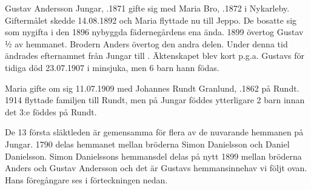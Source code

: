 %
Gustav Andersson Jungar, .1871 gifte sig med Maria Bro, .1872 i Nykarleby. Giftermålet skedde 14.08.1892 och Maria flyttade nu till Jeppo. De bosatte sig som nygifta i den 1896 nybyggda fädernegårdens ena ända. 1899 övertog Gustav ½ av hemmanet. Brodern Anders övertog den andra delen. Under denna tid ändrades efternamnet från Jungar till . Äktenskapet blev kort p.g.a. Gustavs för tidiga död 23.07.1907 i minsjuka, men 6 barn hann födas.
\begin{jhchildren}
  \item {}
  \item {}
  \item {}
  \item {}
  \item {}
  \item {}
\end{jhchildren}

Maria gifte om sig 11.07.1909 med Johannes Rundt Granlund, .1862 på Rundt. 1914 flyttade familjen till Rundt, men på Jungar föddes ytterligare 2 barn innan det 3:e föddes på Rundt.
\begin{jhchildren}
  \item {}
  \item {}
  \item {}
\end{jhchildren}

De 13 första släktleden är gemensamma för flera av de nuvarande hemmanen på Jungar. 1790 delas hemmanet mellan bröderna Simon Danielsson och Daniel Danielsson. Simon Danielssons hemmansdel delas på nytt 1899 mellan bröderna Anders och Gustav Andersson och det är Gustavs hemmansinnehav vi följt ovan. Hans föregångare ses i förteckningen nedan.

